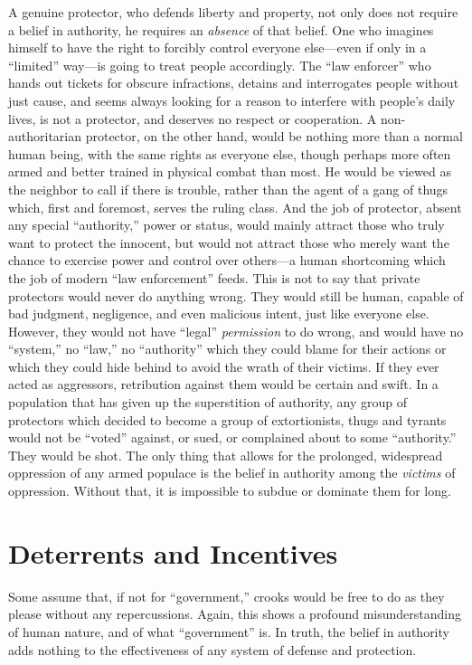 \documentclass{book}
\begin{document}
A genuine protector, who defends liberty and property, not only does not require a belief in authority, he requires an \emph{absence} of that belief. One who imagines himself to have the right to forcibly control everyone else---even if only in a \enquote{limited} way---is going to treat people accordingly. The \enquote{law enforcer} who hands out tickets for obscure infractions, detains and interrogates people without just cause, and seems always looking for a reason to interfere with people's daily lives, is not a protector, and deserves no respect or cooperation. A non-authoritarian protector, on the other hand, would be nothing more than a normal human being, with the same rights as everyone else, though perhaps more often armed and better trained in physical combat than most. He would be viewed as the neighbor to call if there is trouble, rather than the agent of a gang of thugs which, first and foremost, serves the ruling class. And the job of protector, absent any special \enquote{authority,} power or status, would mainly attract those who truly want to protect the innocent, but would not attract those who merely want the chance to exercise power and control over others---a human shortcoming which the job of modern \enquote{law enforcement} feeds. This is not to say that private protectors would never do anything wrong. They would still be human, capable of bad judgment, negligence, and even malicious intent, just like everyone else. However, they would not have \enquote{legal} \emph{permission} to do wrong, and would have no \enquote{system,} no \enquote{law,} no \enquote{authority} which they could blame for their actions or which they could hide behind to avoid the wrath of their victims. If they ever acted as aggressors, retribution against them would be certain and swift. In a population that has given up the superstition of authority, any group of protectors which decided to become a group of extortionists, thugs and tyrants would not be \enquote{voted} against, or sued, or complained about to some \enquote{authority.} They would be shot. The only thing that allows for the prolonged, widespread oppression of any armed populace is the belief in authority among the \emph{victims} of oppression. Without that, it is impossible to subdue or dominate them for long.

\section{Deterrents and Incentives}

Some assume that, if not for \enquote{government,} crooks would be free to do as they please without any repercussions. Again, this shows a profound misunderstanding of human nature, and of what \enquote{government} is. In truth, the belief in authority adds nothing to the effectiveness of any system of defense and protection.
\end{document}
